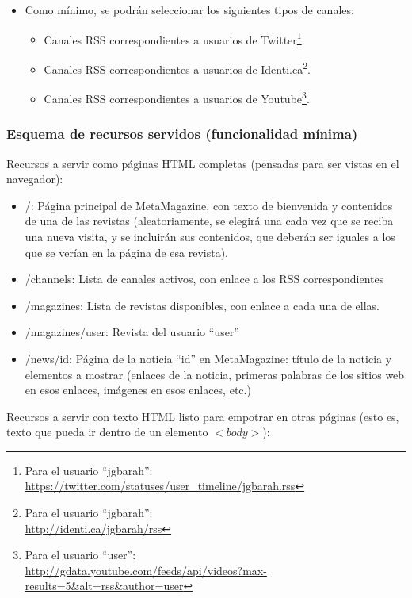 \begin{itemize}
\item Como mínimo, se podrán seleccionar los siguientes tipos de canales:
  \begin{itemize}
  \item Canales RSS correspondientes a usuarios de Twitter\footnote{Para el usuario ``jgbarah'': \\
    \url{https://twitter.com/statuses/user_timeline/jgbarah.rss}}.
  \item Canales RSS correspondientes a usuarios de Identi.ca\footnote{Para el usuario ``jgbarah'': \\
    \url{http://identi.ca/jgbarah/rss}}.
  \item Canales RSS correspondientes a usuarios de Youtube\footnote{Para el usuario ``user'': \\
\url{http://gdata.youtube.com/feeds/api/videos?max-results=5&alt=rss&author=user}}.
  \end{itemize}
\end{itemize}

\subsubsection{Esquema de recursos servidos (funcionalidad mínima)}

Recursos a servir como páginas HTML completas (pensadas para ser vistas en el navegador):

\begin{itemize}
\item /: Página principal de MetaMagazine, con texto de bienvenida y contenidos de una de las revistas (aleatoriamente, se elegirá una cada vez que se reciba una nueva visita, y se incluirán sus contenidos, que deberán ser iguales a los que se verían en la página de esa revista).
\item /channels: Lista de canales activos, con enlace a los RSS correspondientes
\item /magazines: Lista de revistas disponibles, con enlace a cada una de ellas.
\item /magazines/user: Revista del usuario ``user''
\item /news/id: Página de la noticia ``id'' en MetaMagazine: título de la noticia y elementos a mostrar (enlaces de la noticia, primeras palabras de los sitios web en esos enlaces, imágenes en esos enlaces, etc.)
\end{itemize}

Recursos a servir con texto HTML listo para empotrar en otras páginas (esto es, texto que pueda ir dentro de un elemento $<body>$):

